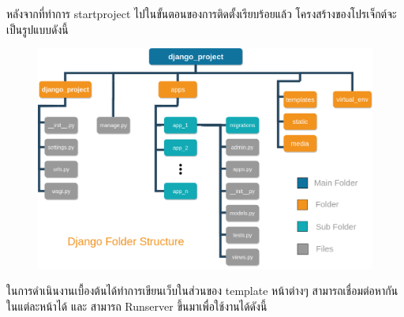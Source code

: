 \newpage
หลังจากที่ทำการ startproject ไปในขั้นตอนของการติดตั้งเรียบร้อยแล้ว โครงสร้างของโปรเจ็กต์จะเป็นรูปแบบดังนี้

\begin{figure}[!thb]
	\captionsetup{justification=centering}
	\centering
	\includegraphics[width=6in]{latex/figures/djangoproject.png}
	\label{fig:djangoproject}
\end{figure}
\newpage

ในการดำเนินงานเบื้องต้นได้ทำการเขียนเว็บในส่วนของ template หน้าต่างๆ  สามารถเชื่อมต่อหากันในแต่ละหน้าได้ และ สามารถ Runserver ขึ้นมาเพื่อใช้งานได้ดังนี้


